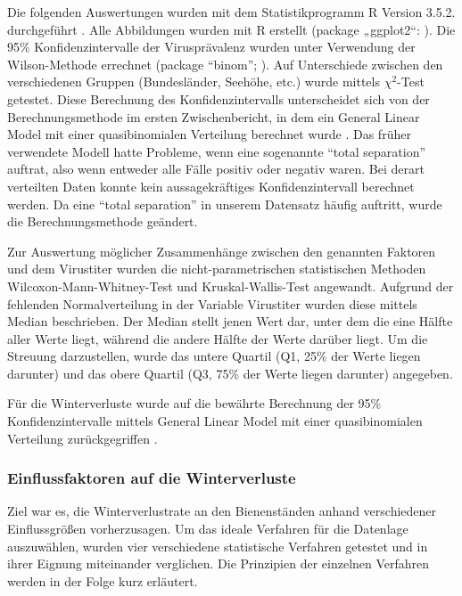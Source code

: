 Die folgenden Auswertungen wurden mit dem Statistikprogramm R Version 3.5.2. durchgeführt \citep{rcoreteam2020}. Alle Abbildungen wurden mit R erstellt (package „ggplot2“: \cite{wickham2016}). Die 95\% Konfidenzintervalle der Virusprävalenz wurden unter Verwendung der Wilson-Methode errechnet (package \enquote{binom}; \cite{binom2014}). Auf Unterschiede zwischen den verschiedenen Gruppen (Bundesländer, Seehöhe, etc.) wurde mittels $\chi^2$-Test getestet. Diese Berechnung des Konfidenzintervalls unterscheidet sich von der Berechnungsmethode im ersten Zwischenbericht, in dem ein General Linear Model mit einer quasibinomialen Verteilung berechnet wurde \citep{vanderzee2013}. Das früher verwendete Modell hatte Probleme, wenn eine sogenannte \enquote{total separation} auftrat, also wenn entweder alle Fälle positiv oder negativ waren. Bei derart verteilten Daten konnte kein aussagekräftiges Konfidenzintervall berechnet werden. Da eine \enquote{total separation} in unserem Datensatz häufig auftritt, wurde die Berechnungsmethode geändert.

Zur Auswertung möglicher Zusammenhänge zwischen den genannten Faktoren und dem Virustiter wurden die nicht-parametrischen statistischen Methoden Wilcoxon-Mann-Whitney-Test und Kruskal-Wallis-Test angewandt. Aufgrund der fehlenden Normalverteilung in der Variable Virustiter wurden diese mittels Median beschrieben. Der Median stellt jenen Wert dar, unter dem die eine Hälfte aller Werte liegt, während die andere Hälfte der Werte darüber liegt. Um die Streuung darzustellen, wurde das untere Quartil (Q1, 25\% der Werte liegen darunter) und das obere Quartil (Q3, 75\% der Werte liegen darunter) angegeben.

Für die Winterverluste wurde auf die bewährte Berechnung der 95\% Konfidenzintervalle mittels General Linear Model mit einer quasibinomialen Verteilung zurückgegriffen \citep{vanderzee2013}.

\subsubsection{Einflussfaktoren auf die Winterverluste}

Ziel war es, die Winterverlustrate an den Bienenständen anhand verschiedener Einflussgrößen vorherzusagen. Um das ideale Verfahren für die Datenlage auszuwählen, wurden vier verschiedene statistische Verfahren getestet und in ihrer Eignung miteinander verglichen. Die Prinzipien der einzelnen Verfahren werden in der Folge kurz erläutert.

